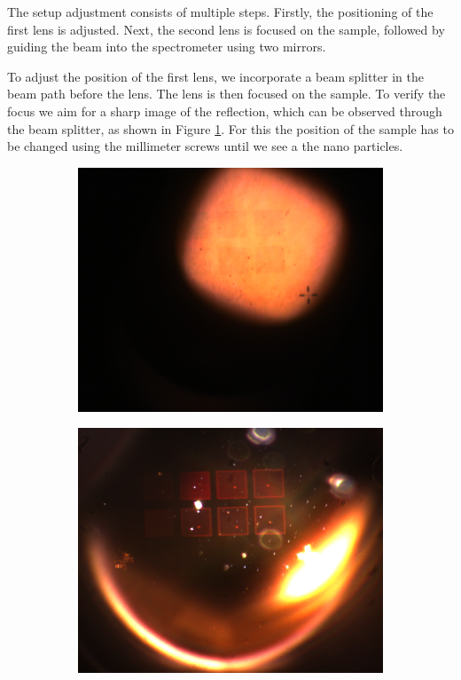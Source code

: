 The setup adjustment consists of multiple steps. Firstly, the positioning of the first lens is adjusted. Next, the second lens is focused on the sample, followed by guiding the beam into the spectrometer using two mirrors.

To adjust the position of the first lens, we incorporate a beam splitter in the beam path before the lens. The lens is then focused on the sample. To verify the focus we aim for a sharp image of the reflection, which can be observed through the beam splitter, as shown in Figure \ref{fig:subfig1}.
For this the position of the sample has to be changed using the millimeter screws until we see a the nano particles.


\begin{figure}[ht]
    \centering
    \begin{subfigure}{0.3\linewidth}
      \includegraphics[width=\linewidth]{data/Gruppe2/image_0.png}
      \caption{}
      \label{fig:subfig1}
    \end{subfigure}
    \begin{subfigure}{0.3\linewidth}
      \includegraphics[width=\linewidth]{data/Gruppe2/image_1.png}

\end{subfigure}
\end{figure}
